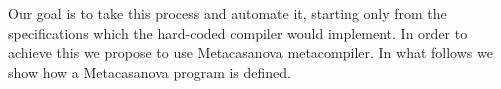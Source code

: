 Our goal is to take this process and automate it, starting only from the specifications which the hard-coded compiler would implement. In order to achieve this we propose to use Metacasanova metacompiler. In what follows we show how a Metacasanova program is defined.
\begin{comment}
\subsection{Requirements of Metacasanova}
In order to relieve programmers of manually defining the behaviour described above in the back-end of the compiler, we propose to use a metacompiler. This metacompiler must include the following features:

\begin{itemize}
	\item It must be possible to define custom operators (or functions) and data containers. This is needed to define the syntactic structures of the language we are defining.
	\item It must be typed: each syntactic structure can be associated to a specific type in order to be able to detect meaningless terms (such as adding a string to an integer) and notify the error.
	\item It must be possible to have polymorphic syntactical structures. This is useful to define equivalent ``roles'' in the language for the same syntactical structure; for instance we can say that an integer literal is both a \textit{Value} and an \textit{Arithmetic expression}.
	\item It must natively support the evaluation of semantics rules, as those shown above. A \textit{rule},in Metacasanova, in the fashion of a logic rule, is made of a sequence of premises and a conclusion. The premises can be function calls or clauses. Clauses are boolean expressions that are checked in order to proceed with the rule evaluation. The function call will run in order all the rules that contain that function as conclusion. The return value of the first rule that succeeds is taken. A rule returns a value if all the clauses evaluate to \texttt{true} and all the function calls succeed.
\end{itemize}

From this specifications, we see that our goal is indeed a metacompiler, as it takes as input a language definition, a program for that language, and outputs runnable code that mimics the code that a hard-coded compiler would output.
\end{comment}

